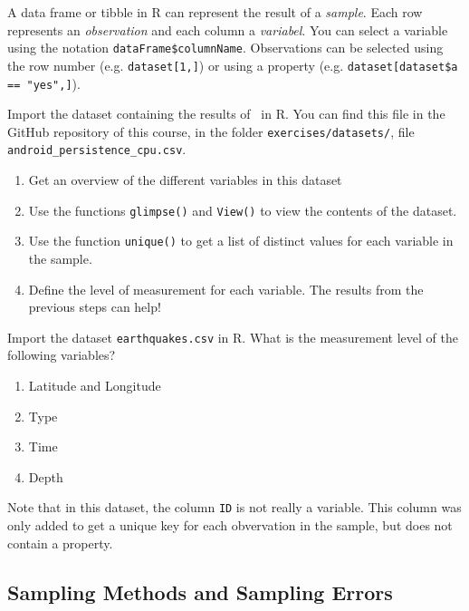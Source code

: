 A data frame or tibble in R can represent the result of a \textit{sample}.
Each row represents an \textit{observation} and each column a \textit{variabel}. 
You can select a variable using the notation \texttt{dataFrame\$columnName}. 
Observations can be selected using the row number (e.g. \texttt{dataset[1,]}) or using a property (e.g. \verb|dataset[dataset$a == "yes",]|).

\begin{exercise}
    Import the dataset containing the results of~\textcite{Akin2016} in R. 
    You can find this file in the GitHub repository of this course, in the folder
    \texttt{exercises/datasets/}, file \texttt{android\_persistence\_cpu.csv}.
    
    \begin{enumerate}
        \item Get an overview of the different variables in this dataset
        \item Use the functions \texttt{glimpse()} and \texttt{View()} to view the contents of the dataset.
        \item Use the function \texttt{unique()} to get a list of distinct values for each variable in the sample.
        \item Define the level of measurement for each variable. The results from the previous steps can help!
      \end{enumerate}
\end{exercise}

\begin{exercise}
  Import the dataset \texttt{earthquakes.csv} in R.
  What is the measurement level of the following variables?
  
  \begin{enumerate}
    \item Latitude and Longitude
    \item Type
    \item Time
    \item Depth
  \end{enumerate}

  Note that in this dataset, the column \texttt{ID} is not really a variable. 
  This column was only added to get a unique key for each obvervation in the sample, but does not contain a property.
\end{exercise}

\subsection{Sampling Methods and Sampling Errors}

